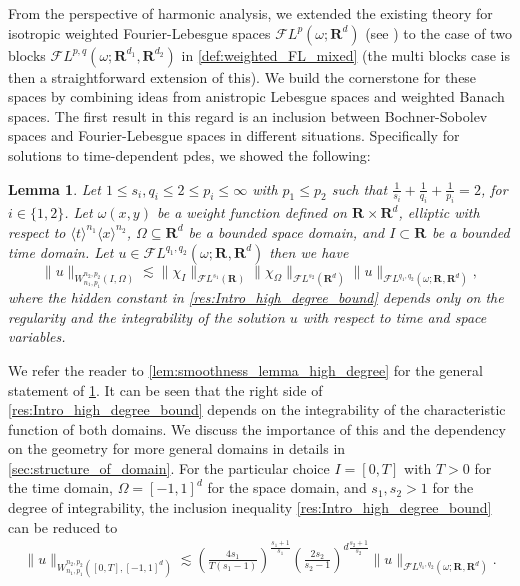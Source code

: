 \documentclass[a4paper]{article}
\newcommand{\rr}[1]{\mathbf{R}^{#1}}
\newcommand{\rrI}{\rr{d_1}}
\newcommand{\rrII}{\rr{d_2}}
\newcommand{\eabs}[1]{\langle #1\rangle}     %
\newcommand{\norm}[2]{\|#1\|_{#2}}
\newcommand{\F}[0]{\mathscr{F}}
\newcommand{\FL}[1]{\F L^{#1}}
\newcommand{\chF}[1]{\chi_{#1}}
\numberwithin{equation}{section}
\newtheorem{lemma}[theorem]{Lemma}
\theoremstyle{remark}
\begin{document}
From the perspective of harmonic analysis,
we extended the existing theory for isotropic weighted Fourier-Lebesgue spaces
$\mathscr{F}L^p(\omega;\rr{d})$ (see \cite{Pilipovic11MicroLocalAnalysisFourier})
to the case of two blocks
$\mathscr{F}L^{p,q}(\omega; \rrI,\rrII)$ in \cref{def:weighted_FL_mixed}
(the multi blocks case is then a straightforward extension of this).
We build the cornerstone for these spaces
by combining ideas from anistropic Lebesgue spaces
and weighted Banach spaces.
The first result in this regard is an inclusion between
Bochner-Sobolev spaces and Fourier-Lebesgue spaces
in different situations.
Specifically for solutions to time-dependent \glspl{pde},
we showed the following:
\begin{lemma}
\label{lem:intro_FourierSobolevImbedding}
    Let
    $1\leq s_i,q_i\leq 2\leq p_i\leq \infty$ with $p_1\leq p_2$
    such that $\frac{1}{s_i}+\frac{1}{q_i}+\frac{1}{p_i}=2$,
    for $i\in\{1,2\}$.
    Let $\omega(x,y)$ be a weight function
    defined on $\rr{}\times\rr{d}$, elliptic with respect to
    $\eabs{t}^{n_1}\eabs{x}^{n_2}$,
    $\Omega \subseteq \rr{d}$ be a bounded space domain,
    and $I\subset \rr{}$ be a bounded time domain.
    Let \(u \in \FL{q_1,q_2}(\omega;\rr{},\rr{d})\)
	then
    we have
    \begin{equation}\label{res:Intro_high_degree_bound}
		\norm{u}{W_{n_1,p_1}^{n_2, p_2}(I, \Omega)}
        \lesssim
        \norm{{\chF{I}}}{\FL{s_1}(\rr{})}
            \norm{{\chF{\Omega}}}{\FL{s_2}(\rr{d})}
            \norm{u}{\FL{q_1,q_2}(\omega;\rr{},\rr{d})},
	\end{equation} 
    where the hidden constant in \cref{res:Intro_high_degree_bound}
    depends only on the regularity and the integrability
    of the solution $u$ with respect to time and space variables.
\end{lemma}
We refer the reader to \cref{lem:smoothness_lemma_high_degree}
for the general statement of \cref{lem:intro_FourierSobolevImbedding}.
It can be seen that the right side of \cref{res:Intro_high_degree_bound}
depends on the integrability of the characteristic function of both domains.
We discuss the importance of this and the dependency
on the geometry for more general domains in details in \cref{sec:structure_of_domain}.
For the particular choice
$I=[0,T]$ with $T>0$ for the time domain,
$\Omega = [-1,1]^d$ for the space domain,
and $s_1, s_2>1$ for the degree of integrability,
the inclusion inequality
\cref{res:Intro_high_degree_bound} can be reduced to
\begin{align}
    \norm{u}{W_{n_1,p_1}^{n_2, p_2}([0,T], [-1,1]^d)}
            \lesssim
            \left(\frac{4s_1}{T(s_1-1)}\right)^{\frac{s_1+1}{s_1}}
            \left(\frac{2s_2}{s_2-1}\right)^{d\frac{s_2+1}{s_2}}
            \norm{u}{\FL{q_1,q_2}(\omega;\rr{}, \rr{d})}.
\end{align}
\end{document}

